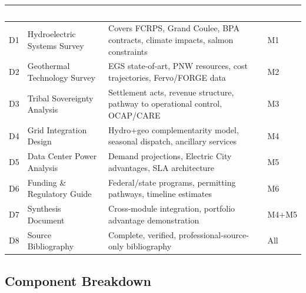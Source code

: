 \documentclass[11pt,letterpaper]{article}
\newcommand{\tableheader}[1]{\textbf{\sffamily\textcolor{white}{#1}}}
\begin{document}
\begin{center}
\begin{tabularx}{\textwidth}{C{0.5cm}L{4cm}XC{1.5cm}}
\toprule
{}
\tableheader{\#} & \tableheader{Deliverable} & \tableheader{Acceptance Criteria} & \tableheader{Spec} \\
\midrule
D1 & Hydroelectric Systems Survey & Covers FCRPS, Grand Coulee, BPA contracts, climate impacts, salmon constraints & M1 \\
D2 & Geothermal Technology Survey & EGS state-of-art, PNW resources, cost trajectories, Fervo/FORGE data & M2 \\
D3 & Tribal Sovereignty Analysis & Settlement acts, revenue structure, pathway to operational control, OCAP/CARE & M3 \\
D4 & Grid Integration Design & Hydro+geo complementarity model, seasonal dispatch, ancillary services & M4 \\
D5 & Data Center Power Analysis & Demand projections, Electric City advantages, SLA architecture & M5 \\
D6 & Funding \& Regulatory Guide & Federal/state programs, permitting pathways, timeline estimates & M6 \\
D7 & Synthesis Document & Cross-module integration, portfolio advantage demonstration & M4+M5 \\
D8 & Source Bibliography & Complete, verified, professional-source-only bibliography & All \\
\bottomrule
\end{tabularx}
\end{center}

\subsection{Component Breakdown}
\end{document}
